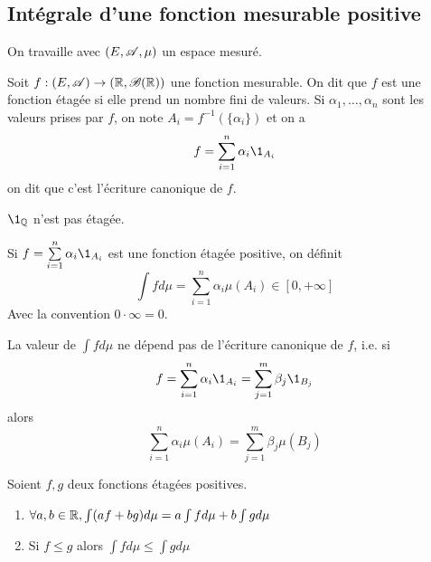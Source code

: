 \subsection{Intégrale d'une fonction mesurable positive}


On travaille avec $(E,\mathscr{A},\mu)$ un espace mesuré.

\begin{definition}
	Soit $f: (E, \mathscr{A}) \to (\mathbb{R}, \mathscr{B}(\mathbb{R}))$ une fonction mesurable. On dit que $f$ est une fonction étagée
	si elle prend un nombre fini de valeurs.
	Si $\alpha_1, \dots, \alpha_n$ sont les valeurs prises par $f$, on note
	$A_i = f^{-1}(\{\alpha_i\})$ et on a
	$$ f = \sum_{i=1}^n \alpha_i \1_{A_i} $$
	on dit que c'est l'écriture canonique de $f$.
\end{definition}

\begin{remarque}
	$\1_{\Q}$ n'est pas étagée.
\end{remarque}


\begin{definition}
	Si $f = \sum\limits_{i=1}^n \alpha_i \1_{A_i}$ est une fonction étagée positive, on définit
	$$ \int f d\mu = \sum_{i=1}^n \alpha_i \mu(A_i) \in [0, +\infty] $$
	Avec la convention $0 \cdot \infty = 0$.
\end{definition}


\begin{remarque}
	La valeur de $\int f d\mu$ ne dépend pas de l'écriture canonique de $f$, i.e. si
	$$ f = \sum_{i=1}^n \alpha_i \1_{A_i} = \sum_{j=1}^m \beta_j \1_{B_j} $$
	alors
	$$ \sum_{i=1}^n \alpha_i \mu(A_i) = \sum_{j=1}^m \beta_j \mu(B_j) $$
\end{remarque} %

\begin{prop}
	Soient $f,g$ deux fonctions étagées positives.
	\begin{enumerate}
		\item $  \forall a, b \in \mathbb{R}, \int (af + bg) d\mu = a \int f d\mu + b \int g d\mu$
		\item Si $f \leq g$ alors $\int f d\mu \leq \int g d\mu$
	\end{enumerate}
\end{prop}

